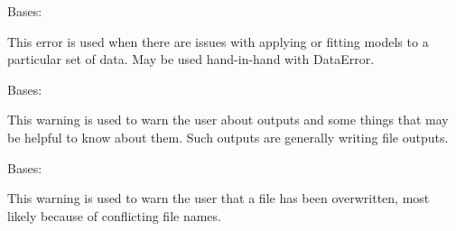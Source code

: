 \documentclass[letterpaper,10pt,english]{sphinxmanual}
\begin{document}

\begin{fulllineitems}
\label{\detokenize{python_docstrings/IfA_Smeargle.meta.errors:IfA_Smeargle.meta.errors.ModelingError}}
Bases: {\hyperref[\detokenize{python_docstrings/IfA_Smeargle.meta.errors:IfA_Smeargle.meta.errors.Smeargle_Exception}]{}}

This error is used when there are issues with applying or fitting models
to a particular set of data. May be used hand-in-hand with DataError.

\end{fulllineitems}


\begin{fulllineitems}
\label{\detokenize{python_docstrings/IfA_Smeargle.meta.errors:IfA_Smeargle.meta.errors.OutputWarning}}
Bases: {\hyperref[\detokenize{python_docstrings/IfA_Smeargle.meta.errors:IfA_Smeargle.meta.errors.Smeargle_Warning}]{}}

This warning is used to warn the user about outputs and some things that
may be helpful to know about them. Such outputs are generally writing
file outputs.

\end{fulllineitems}


\begin{fulllineitems}
\label{\detokenize{python_docstrings/IfA_Smeargle.meta.errors:IfA_Smeargle.meta.errors.OverwriteWarning}}
Bases: {\hyperref[\detokenize{python_docstrings/IfA_Smeargle.meta.errors:IfA_Smeargle.meta.errors.Smeargle_Warning}]{}}

This warning is used to warn the user that a file has been overwritten,
most likely because of conflicting file names.

\end{fulllineitems}
\end{document}
